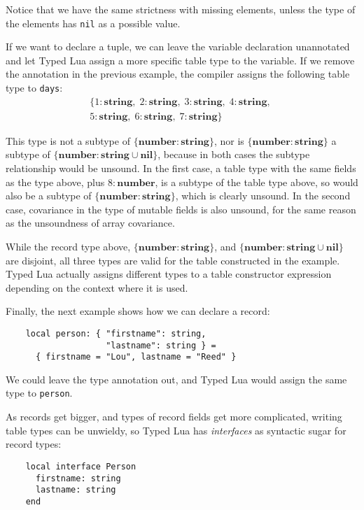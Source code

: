 \documentclass[preprint]{sig-alternate}
\newcommand{\Nil}{\mathbf{nil}}
\newcommand{\Number}{\mathbf{number}}
\newcommand{\String}{\mathbf{string}}
\begin{document}
Notice that we have the same strictness with missing
elements, unless the type of the elements has {\tt nil}
as a possible value.

If we want to declare a tuple, we can leave the
variable declaration unannotated and let Typed Lua assign
a more specific table type to the variable.
If we remove the annotation in the previous example, 
the compiler assigns the following table type to \texttt{days}:
\begin{align*}
\{{1:\String},\;{2:\String},\;{3:\String},\;{4:\String},\;\\
{5:\String},\;{6:\String},\;{7:\String}\}
\end{align*}

This type is not a subtype of $\{\Number:\String\}$, nor
is $\{\Number:\String\}$ a subtype of $\{\Number:
\String\cup\Nil\}$, because in both cases the subtype
relationship would be unsound. In the first case,
a table type with the same fields as the type above,
plus $8: \Number$, is a subtype of the table type
above, so would also be a subtype of $\{\Number:\String\}$,
which is clearly unsound. In the second case, covariance
in the type of mutable fields is also unsound, for the
same reason as the unsoundness of array covariance.

While the record type above, $\{\Number:\String\}$, and
$\{\Number: \String\cup\Nil\}$ are disjoint, all three
types are valid for the table constructed in the example.
Typed Lua actually assigns different types to a table constructor
expression depending on the context where it is used.

Finally, the next example shows how we can declare a record:

\begin{verbatim}
    local person: { "firstname": string,
                    "lastname": string } =
      { firstname = "Lou", lastname = "Reed" } 
\end{verbatim}

We could leave the type annotation out, and Typed Lua would
assign the same type to {\tt person}.

As records get bigger, and types of record fields get more
complicated, writing table types can be unwieldy, so Typed
Lua has {\em interfaces} as syntactic sugar for record types:

\begin{verbatim}
    local interface Person
      firstname: string
      lastname: string
    end
\end{verbatim}
\end{document}
